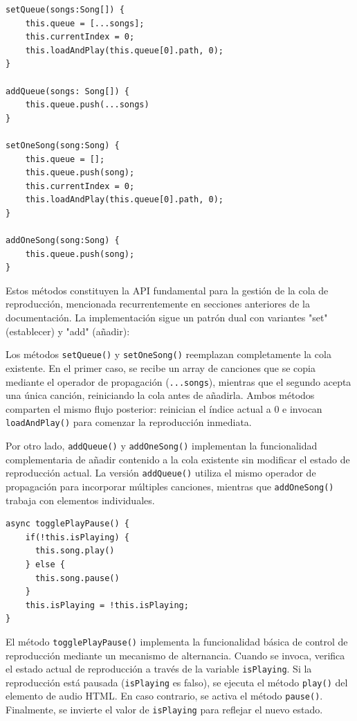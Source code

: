 \documentclass[11pt, a4paper]{article}
\begin{document}
                \begin{lstlisting}[caption={set y add}]
setQueue(songs:Song[]) {
    this.queue = [...songs];
    this.currentIndex = 0;
    this.loadAndPlay(this.queue[0].path, 0);
}

addQueue(songs: Song[]) {
    this.queue.push(...songs)
}

setOneSong(song:Song) {
    this.queue = [];
    this.queue.push(song);
    this.currentIndex = 0;
    this.loadAndPlay(this.queue[0].path, 0);
}

addOneSong(song:Song) {
    this.queue.push(song);
}
                \end{lstlisting}

                Estos métodos constituyen la API fundamental para la gestión de la cola de reproducción, mencionada recurrentemente en secciones anteriores de la documentación. La implementación sigue un patrón dual con variantes "set" (establecer) y "add" (añadir):

                Los métodos \verb|setQueue()| y \verb|setOneSong()| reemplazan completamente la cola existente. En el primer caso, se recibe un array de canciones que se copia mediante el operador de propagación (\verb|...songs|), mientras que el segundo acepta una única canción, reiniciando la cola antes de añadirla. Ambos métodos comparten el mismo flujo posterior: reinician el índice actual a 0 e invocan \verb|loadAndPlay()| para comenzar la reproducción inmediata.

                Por otro lado, \verb|addQueue()| y \verb|addOneSong()| implementan la funcionalidad complementaria de añadir contenido a la cola existente sin modificar el estado de reproducción actual. La versión \verb|addQueue()| utiliza el mismo operador de propagación para incorporar múltiples canciones, mientras que \verb|addOneSong()| trabaja con elementos individuales.

                \begin{lstlisting}[caption={togglePlayPause()}]
async togglePlayPause() {
    if(!this.isPlaying) {
      this.song.play()
    } else {
      this.song.pause()
    }
    this.isPlaying = !this.isPlaying;
}
                \end{lstlisting}
                 
                El método \verb|togglePlayPause()| implementa la funcionalidad básica de control de reproducción mediante un mecanismo de alternancia. Cuando se invoca, verifica el estado actual de reproducción a través de la variable \verb|isPlaying|. Si la reproducción está pausada (\verb|isPlaying| es falso), se ejecuta el método \verb|play()| del elemento de audio HTML. En caso contrario, se activa el método \verb|pause()|. Finalmente, se invierte el valor de \verb|isPlaying| para reflejar el nuevo estado.
\end{document}
